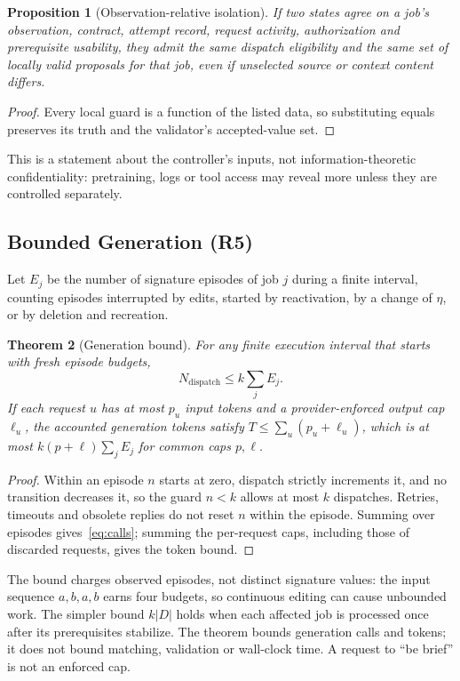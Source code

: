 \documentclass[10pt,journal,compsoc]{IEEEtran}
\theoremstyle{plain}
\newtheorem{theorem}{Theorem}
\newtheorem{proposition}[theorem]{Proposition}
\theoremstyle{definition}
\begin{document}
\begin{proposition}[Observation-relative isolation]\label{prop:isolation}
If two states agree on a job's observation, contract, attempt record, request activity, authorization and prerequisite usability, they admit the same dispatch eligibility and the same set of locally valid proposals for that job, even if unselected source or context content differs.
\end{proposition}
\begin{proof}
Every local guard is a function of the listed data, so substituting equals preserves its truth and the validator's accepted-value set.
\end{proof}

This is a statement about the controller's inputs, not information-theoretic confidentiality: pretraining, logs or tool access may reveal more unless they are controlled separately.

\subsection{Bounded Generation (R5)}
Let $E_j$ be the number of signature episodes of job $j$ during a finite interval, counting episodes interrupted by edits, started by reactivation, by a change of $\eta$, or by deletion and recreation.

\begin{theorem}[Generation bound]\label{thm:cost}
For any finite execution interval that starts with fresh episode budgets,
\begin{equation}\label{eq:calls}
N_{\mathrm{dispatch}}\le k\textstyle\sum_j E_j.
\end{equation}
If each request $u$ has at most $p_u$ input tokens and a provider-enforced output cap $\ell_u$, the accounted generation tokens satisfy $T\le\sum_{u}(p_u+\ell_u)$, which is at most $k(p+\ell)\sum_jE_j$ for common caps $p,\ell$.
\end{theorem}
\begin{proof}
Within an episode $n$ starts at zero, dispatch strictly increments it, and no transition decreases it, so the guard $n<k$ allows at most $k$ dispatches. Retries, timeouts and obsolete replies do not reset $n$ within the episode. Summing over episodes gives~\eqref{eq:calls}; summing the per-request caps, including those of discarded requests, gives the token bound.
\end{proof}

The bound charges observed episodes, not distinct signature values: the input sequence $a,b,a,b$ earns four budgets, so continuous editing can cause unbounded work. The simpler bound $k|D|$ holds when each affected job is processed once after its prerequisites stabilize. The theorem bounds generation calls and tokens; it does not bound matching, validation or wall-clock time. A request to ``be brief'' is not an enforced cap.
\end{document}
